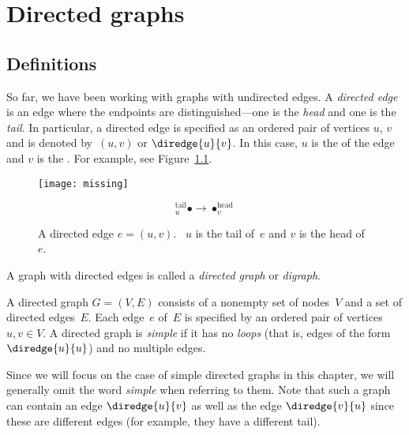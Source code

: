 \chapter{Directed graphs}\label{chap:digraphs}

\section{Definitions}

So far, we have been working with graphs with undirected edges.  A
\emph{directed edge} is an edge where the endpoints are
distinguished---one is the \emph{head} and one is the \emph{tail}.  In
particular, a directed edge is specified as an ordered pair of
vertices $u$, $v$ and is denoted by~$(u, v)$ or $\diredge{u}{v}$.  In this
case, $u$ is the  of the edge and $v$ is the .
For example, see Figure~\ref{fig:6EA}.

\begin{figure}

\missinggraphic

\texttt{[image: missing]}

\begin{equation*}
    {}_u^{\text{tail}} \bullet \to \bullet_v^{\text{head}}
\end{equation*}

\caption{A directed edge $e = (u, v)$.  \ $u$ is the tail of~$e$ and
  $v$ is the head of~$e$.}

\label{fig:6EA}
\end{figure}

A graph with directed edges is called a \emph{directed graph} or
\emph{digraph}.

\begin{definition}\label{def:digraph}
A directed graph $G = (V, E)$ consists of a nonempty set of nodes~$V$
and a set of directed edges~$E$.  Each edge~$e$ of~$E$ is specified by
an ordered pair of vertices $u, v \in V$.  A directed graph
is \emph{simple} if it has no \emph{loops} (that is, edges of the form
$\diredge{u}{u}$) and no multiple edges.
\end{definition}

Since we will focus on the case of simple directed graphs in this
chapter, we will generally omit the word \emph{simple} when referring
to them.  Note that such a graph can contain an edge $\diredge{u}{v}$
as well as the edge $\diredge{v}{u}$ since these are different edges
(for example, they have a different tail).

